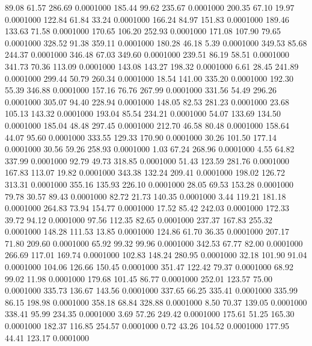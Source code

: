   89.08   61.57  286.69   0.0001000
 185.44   99.62  235.67   0.0001000
 200.35   67.10   19.97   0.0001000
 122.84   61.84   33.24   0.0001000
 166.24   84.97  151.83   0.0001000
 189.46  133.63   71.58   0.0001000
 170.65  106.20  252.93   0.0001000
 171.08  107.90   79.65   0.0001000
 328.52   91.38  359.11   0.0001000
 180.28   46.18    5.39   0.0001000
 349.53   85.68  244.37   0.0001000
 346.48   67.03  349.60   0.0001000
 239.51   86.19   58.51   0.0001000
 341.73   70.36  113.09   0.0001000
 143.08  143.27  198.32   0.0001000
   6.61   28.45  241.89   0.0001000
 299.44   50.79  260.34   0.0001000
  18.54  141.00  335.20   0.0001000
 192.30   55.39  346.88   0.0001000
 157.16   76.76  267.99   0.0001000
 331.56   54.49  296.26   0.0001000
 305.07   94.40  228.94   0.0001000
 148.05   82.53  281.23   0.0001000
  23.68  105.13  143.32   0.0001000
 193.04   85.54  234.21   0.0001000
  54.07  133.69  134.50   0.0001000
 185.04   48.48  297.45   0.0001000
 212.70   46.58   80.48   0.0001000
 158.64   44.07   95.60   0.0001000
 333.55  129.33  170.90   0.0001000
  30.26  101.50  177.14   0.0001000
  30.56   59.26  258.93   0.0001000
   1.03   67.24  268.96   0.0001000
   4.55   64.82  337.99   0.0001000
  92.79   49.73  318.85   0.0001000
  51.43  123.59  281.76   0.0001000
 167.83  113.07   19.82   0.0001000
 343.38  132.24  209.41   0.0001000
 198.02  126.72  313.31   0.0001000
 355.16  135.93  226.10   0.0001000
  28.05   69.53  153.28   0.0001000
  79.78   30.57   89.43   0.0001000
  82.72   21.73  140.35   0.0001000
   3.44  119.21  181.18   0.0001000
 264.83   73.94  154.77   0.0001000
  17.52   85.42  242.03   0.0001000
 172.33   39.72   94.12   0.0001000
  97.56  112.35   82.65   0.0001000
 237.37  167.83  255.32   0.0001000
 148.28  111.53   13.85   0.0001000
 124.86   61.70   36.35   0.0001000
 207.17   71.80  209.60   0.0001000
  65.92   99.32   99.96   0.0001000
 342.53   67.77   82.00   0.0001000
 266.69  117.01  169.74   0.0001000
 102.83  148.24  280.95   0.0001000
  32.18  101.90   91.04   0.0001000
 104.06  126.66  150.45   0.0001000
 351.47  122.42   79.37   0.0001000
  68.92   99.02   11.98   0.0001000
 179.68  101.45   86.77   0.0001000
 252.01  123.57   75.00   0.0001000
 335.73  136.67  143.56   0.0001000
 337.65   66.25  335.41   0.0001000
 335.99   86.15  198.98   0.0001000
 358.18   68.84  328.88   0.0001000
   8.50   70.37  139.05   0.0001000
 338.41   95.99  234.35   0.0001000
   3.69   57.26  249.42   0.0001000
 175.61   51.25  165.30   0.0001000
 182.37  116.85  254.57   0.0001000
   0.72   43.26  104.52   0.0001000
 177.95   44.41  123.17   0.0001000
